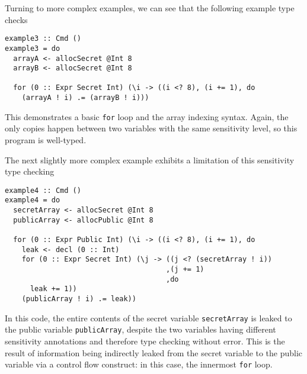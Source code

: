 \documentclass[10pt, conference]{IEEEtran}
\newcommand{\ttt}{\texttt}
\begin{document}
Turning to more complex examples, we can see that the following example type checks

\begin{lstlisting}
example3 :: Cmd ()
example3 = do
  arrayA <- allocSecret @Int 8
  arrayB <- allocSecret @Int 8

  for (0 :: Expr Secret Int) (\i -> ((i <? 8), (i += 1), do
    (arrayA ! i) .= (arrayB ! i)))
\end{lstlisting}

\noindent This demonstrates a basic \ttt{for} loop and the array indexing syntax. Again, the
only copies happen between two variables with the same sensitivity level, so this
program is well-typed.

The next slightly more complex example exhibits a limitation of this sensitivity type checking

\begin{lstlisting}
example4 :: Cmd ()
example4 = do
  secretArray <- allocSecret @Int 8
  publicArray <- allocPublic @Int 8

  for (0 :: Expr Public Int) (\i -> ((i <? 8), (i += 1), do
    leak <- decl (0 :: Int)
    for (0 :: Expr Secret Int) (\j -> ((j <? (secretArray ! i))
                                      ,(j += 1)
                                      ,do
      leak += 1))
    (publicArray ! i) .= leak))
\end{lstlisting}

In this code, the entire contents of the secret variable \ttt{secretArray} is leaked
to the public variable \ttt{publicArray}, despite the two variables having different
sensitivity annotations and therefore type checking without error. This is the
result of information being indirectly leaked from the secret variable to the
public variable via a control flow construct: in this case, the innermost \ttt{for} loop.
\end{document}
